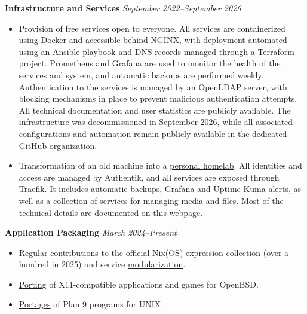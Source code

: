 \documentclass[margin,line]{../res}
\begin{document}
\begin{resume}
  {\bf Infrastructure and Services}
  \hfill {\it September 2022--September 2026}
  \vspace*{.05in}
  \begin{itemize}
    \item Provision of free services open to everyone. All services
      are containerized using Docker and accessible behind NGINX,
      with deployment automated using an Ansible playbook and DNS
      records managed through a Terraform project. Prometheus and
      Grafana are used to monitor the health of the services and
      system, and automatic backups are performed weekly.
      Authentication to the services is managed by an OpenLDAP
      server, with blocking mechanisms in place to prevent malicious
      authentication attempts. All technical documentation and
      user statistics are publicly available. The infrastructure
      was decommissioned in September 2026, while all associated
      configurations and automation remain publicly available in the
      dedicated
      \href{https://github.com/theobori-cafe}{GitHub organization}.
    \item Transformation of an old machine into a
      \href{https://github.com/theobori/homelab}{personal homelab}.
      All identities and
      access are managed by Authentik, and all services are exposed
      through Traefik. It includes automatic backups, Grafana and
      Uptime Kuma alerts, as well as a collection of services for
      managing media and files. Most of the technical details are
      documented on
      \href{https://theobori.cafe/posts/homelab/}{this webpage}.
  \end{itemize}

  {\bf Application Packaging}
  \hfill {\it March 2024--Present}
  \vspace*{.05in}
  \begin{itemize}
    \item Regular
      \href{https://repology.org/maintainer/theobori@disroot.org}{contributions}
      to the official Nix(OS) expression collection (over a hundred in
      2025) and service
      \href{https://github.com/theobori/nix-teeworlds}{modularization}.
    \item \href{https://github.com/theobori/openbsd-ports}{Porting} of
      X11-compatible applications and games for OpenBSD.
    \item \href{https://github.com/theobori/9ports}{Portages} of Plan
      9 programs for UNIX.
  \end{itemize}


\end{resume}
\end{document}

